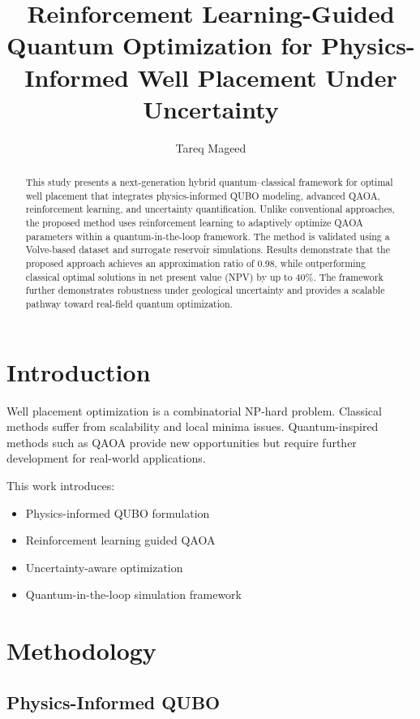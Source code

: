 \documentclass[preprint,12pt]{elsarticle}
\begin{document}
\title{Reinforcement Learning-Guided Quantum Optimization for Physics-Informed Well Placement Under Uncertainty}

\author{Tareq Mageed}
\address{Ministry of Oil, Iraq}

\begin{abstract}
This study presents a next-generation hybrid quantum--classical framework for optimal well placement that integrates physics-informed QUBO modeling, advanced QAOA, reinforcement learning, and uncertainty quantification. Unlike conventional approaches, the proposed method uses reinforcement learning to adaptively optimize QAOA parameters within a quantum-in-the-loop framework. The method is validated using a Volve-based dataset and surrogate reservoir simulations. Results demonstrate that the proposed approach achieves an approximation ratio of 0.98, while outperforming classical optimal solutions in net present value (NPV) by up to 40\%. The framework further demonstrates robustness under geological uncertainty and provides a scalable pathway toward real-field quantum optimization.
\end{abstract}

\section{Introduction}

Well placement optimization is a combinatorial NP-hard problem. Classical methods suffer from scalability and local minima issues. Quantum-inspired methods such as QAOA provide new opportunities but require further development for real-world applications.

This work introduces:
\begin{itemize}
\item Physics-informed QUBO formulation
\item Reinforcement learning guided QAOA
\item Uncertainty-aware optimization
\item Quantum-in-the-loop simulation framework
\end{itemize}

\section{Methodology}

\subsection{Physics-Informed QUBO}
\end{document}
